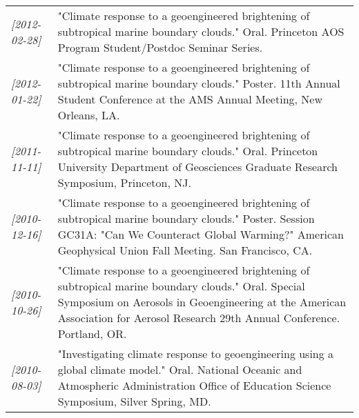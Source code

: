 \documentclass[12pt,letterpaper]{article}
\begin{document}
\begin{center}
\begin{tabularx}{\textwidth}{lX}
\textit{[2012-02-28]} & "Climate response to a geoengineered brightening of subtropical marine boundary clouds."  Oral.  Princeton AOS Program Student/Postdoc Seminar Series.\\
\textit{[2012-01-22]} & "Climate response to a geoengineered brightening of subtropical marine boundary clouds."  Poster.  11th Annual Student Conference at the AMS Annual Meeting, New Orleans, LA.\\
\textit{[2011-11-11]} & "Climate response to a geoengineered brightening of subtropical marine boundary clouds."  Oral.  Princeton University Department of Geosciences Graduate Research Symposium, Princeton, NJ.\\
\textit{[2010-12-16]} & "Climate response to a geoengineered brightening of subtropical marine boundary clouds."  Poster.  Session GC31A: "Can We Counteract Global Warming?" American Geophysical Union Fall Meeting.  San Francisco, CA.\\
\textit{[2010-10-26]} & "Climate response to a geoengineered brightening of subtropical marine boundary clouds."  Oral.  Special Symposium on Aerosols in Geoengineering at the American Association for Aerosol Research 29th Annual Conference.  Portland, OR.\\
\textit{[2010-08-03]} & "Investigating climate response to geoengineering using a global climate model."  Oral.  National Oceanic and Atmospheric Administration Office of Education Science Symposium, Silver Spring, MD.\\
\end{tabularx}
\end{center}

\end{document}
